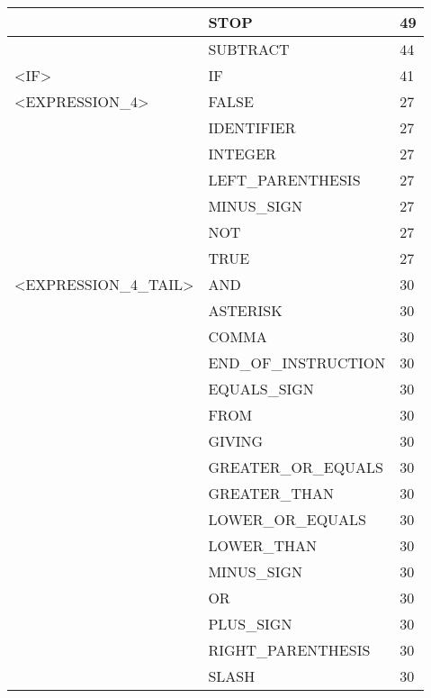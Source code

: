 \begin{longtable}{|l|l|l|}
                     &   STOP                 &   49 \\ \hline
                     &   SUBTRACT             &   44 \\ \hline
<IF>                 &   IF                   &   41 \\ \hline
<EXPRESSION\_4>       &   FALSE                &   27 \\ \hline
                     &   IDENTIFIER           &   27 \\ \hline
                     &   INTEGER              &   27 \\ \hline
                     &   LEFT\_PARENTHESIS     &   27 \\ \hline
                     &   MINUS\_SIGN           &   27 \\ \hline
                     &   NOT                  &   27 \\ \hline
                     &   TRUE                 &   27 \\ \hline
<EXPRESSION\_4\_TAIL>  &   AND                  &   30 \\ \hline
                     &   ASTERISK             &   30 \\ \hline
                     &   COMMA                &   30 \\ \hline
                     &   END\_OF\_INSTRUCTION   &   30 \\ \hline
                     &   EQUALS\_SIGN          &   30 \\ \hline
                     &   FROM                 &   30 \\ \hline
                     &   GIVING               &   30 \\ \hline
                     &   GREATER\_OR\_EQUALS    &   30 \\ \hline
                     &   GREATER\_THAN         &   30 \\ \hline
                     &   LOWER\_OR\_EQUALS      &   30 \\ \hline
                     &   LOWER\_THAN           &   30 \\ \hline
                     &   MINUS\_SIGN           &   30 \\ \hline
                     &   OR                   &   30 \\ \hline
                     &   PLUS\_SIGN            &   30 \\ \hline
                     &   RIGHT\_PARENTHESIS    &   30 \\ \hline
                     &   SLASH                &   30 \\ \hline

\end{longtable}
